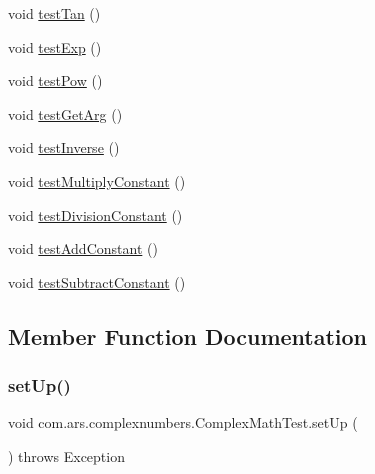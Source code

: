 \begin{DoxyCompactItemize}
\item 
void \hyperlink{classcom_1_1ars_1_1complexnumbers_1_1_complex_math_test_abcec8968bf43093a912ba2c24f4718a9}{test\+Tan} ()
\item 
void \hyperlink{classcom_1_1ars_1_1complexnumbers_1_1_complex_math_test_abd1ea731d0875c3351306079e4694c24}{test\+Exp} ()
\item 
void \hyperlink{classcom_1_1ars_1_1complexnumbers_1_1_complex_math_test_a70af211131478c43b06210fe524d3bd7}{test\+Pow} ()
\item 
void \hyperlink{classcom_1_1ars_1_1complexnumbers_1_1_complex_math_test_a2102465aa80b8303b2de77a3e87ffea9}{test\+Get\+Arg} ()
\item 
void \hyperlink{classcom_1_1ars_1_1complexnumbers_1_1_complex_math_test_a2c47b64252c4ecbe00d38fe89e66a9bb}{test\+Inverse} ()
\item 
void \hyperlink{classcom_1_1ars_1_1complexnumbers_1_1_complex_math_test_a118231be2a26c23d165d3b40093352ac}{test\+Multiply\+Constant} ()
\item 
void \hyperlink{classcom_1_1ars_1_1complexnumbers_1_1_complex_math_test_a7250df204110c40becd58a0886ec8e7c}{test\+Division\+Constant} ()
\item 
void \hyperlink{classcom_1_1ars_1_1complexnumbers_1_1_complex_math_test_a0dba8a864962376e684cfcbc1baa80f4}{test\+Add\+Constant} ()
\item 
void \hyperlink{classcom_1_1ars_1_1complexnumbers_1_1_complex_math_test_a535b2562407e9de2c6aea700d5e1a0f8}{test\+Subtract\+Constant} ()
\end{DoxyCompactItemize}


\subsection{Member Function Documentation}
\hypertarget{classcom_1_1ars_1_1complexnumbers_1_1_complex_math_test_a038ac671e0502ed2448f4649da993131}{}\label{classcom_1_1ars_1_1complexnumbers_1_1_complex_math_test_a038ac671e0502ed2448f4649da993131} 
\subsubsection{\texorpdfstring{set\+Up()}{setUp()}}
{\footnotesize\ttfamily void com.\+ars.\+complexnumbers.\+Complex\+Math\+Test.\+set\+Up (\begin{DoxyParamCaption}{ }\end{DoxyParamCaption}) throws Exception}

